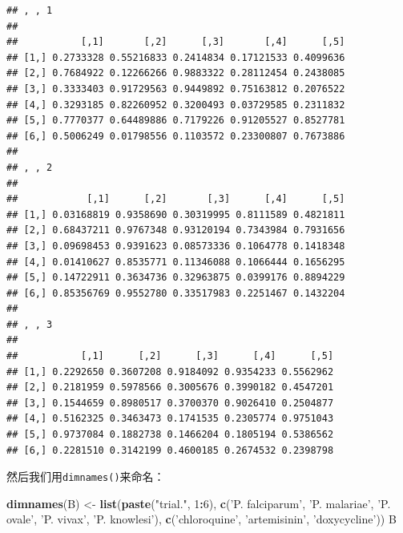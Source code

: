 \documentclass[]{book}
\newenvironment{Shaded}{\begin{snugshade}}{\end{snugshade}}
\newcommand{\DecValTok}[1]{\textcolor[rgb]{0.00,0.00,0.81}{#1}}
\newcommand{\KeywordTok}[1]{\textcolor[rgb]{0.13,0.29,0.53}{\textbf{#1}}}
\newcommand{\NormalTok}[1]{#1}
\newcommand{\OperatorTok}[1]{\textcolor[rgb]{0.81,0.36,0.00}{\textbf{#1}}}
\newcommand{\StringTok}[1]{\textcolor[rgb]{0.31,0.60,0.02}{#1}}
\begin{document}
\begin{verbatim}
## , , 1
## 
##           [,1]       [,2]      [,3]       [,4]      [,5]
## [1,] 0.2733328 0.55216833 0.2414834 0.17121533 0.4099636
## [2,] 0.7684922 0.12266266 0.9883322 0.28112454 0.2438085
## [3,] 0.3333403 0.91729563 0.9449892 0.75163812 0.2076522
## [4,] 0.3293185 0.82260952 0.3200493 0.03729585 0.2311832
## [5,] 0.7770377 0.64489886 0.7179226 0.91205527 0.8527781
## [6,] 0.5006249 0.01798556 0.1103572 0.23300807 0.7673886
## 
## , , 2
## 
##            [,1]      [,2]       [,3]      [,4]      [,5]
## [1,] 0.03168819 0.9358690 0.30319995 0.8111589 0.4821811
## [2,] 0.68437211 0.9767348 0.93120194 0.7343984 0.7931656
## [3,] 0.09698453 0.9391623 0.08573336 0.1064778 0.1418348
## [4,] 0.01410627 0.8535771 0.11346088 0.1066444 0.1656295
## [5,] 0.14722911 0.3634736 0.32963875 0.0399176 0.8894229
## [6,] 0.85356769 0.9552780 0.33517983 0.2251467 0.1432204
## 
## , , 3
## 
##           [,1]      [,2]      [,3]      [,4]      [,5]
## [1,] 0.2292650 0.3607208 0.9184092 0.9354233 0.5562962
## [2,] 0.2181959 0.5978566 0.3005676 0.3990182 0.4547201
## [3,] 0.1544659 0.8980517 0.3700370 0.9026410 0.2504877
## [4,] 0.5162325 0.3463473 0.1741535 0.2305774 0.9751043
## [5,] 0.9737084 0.1882738 0.1466204 0.1805194 0.5386562
## [6,] 0.2281510 0.3142199 0.4600185 0.2674532 0.2398798
\end{verbatim}

然后我们用\texttt{dimnames()}来命名：

\begin{Shaded}
\begin{Highlighting}[]
\KeywordTok{dimnames}\NormalTok{(B) <-}\StringTok{ }\KeywordTok{list}\NormalTok{(}\KeywordTok{paste}\NormalTok{(}\StringTok{"trial."}\NormalTok{, }\DecValTok{1}\OperatorTok{:}\DecValTok{6}\NormalTok{), }\KeywordTok{c}\NormalTok{(}\StringTok{'P. falciparum'}\NormalTok{, }\StringTok{'P. malariae'}\NormalTok{, }\StringTok{'P. ovale'}\NormalTok{, }\StringTok{'P. vivax'}\NormalTok{, }\StringTok{'P. knowlesi'}\NormalTok{), }\KeywordTok{c}\NormalTok{(}\StringTok{'chloroquine'}\NormalTok{, }\StringTok{'artemisinin'}\NormalTok{, }\StringTok{'doxycycline'}\NormalTok{))}
\NormalTok{B}
\end{Highlighting}
\end{Shaded}
\end{document}
